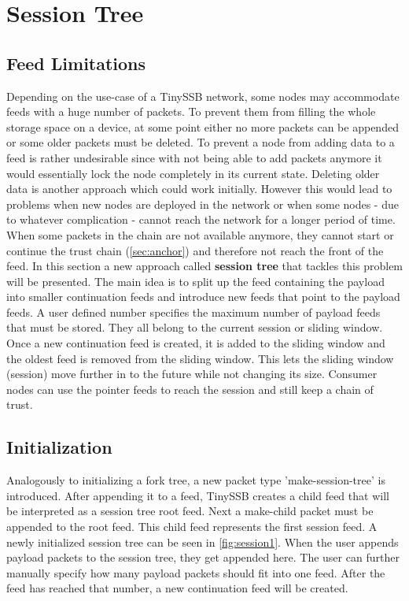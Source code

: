\section{Session Tree}

\subsection{Feed Limitations}
\label{sec:sessionlimit}
Depending on the use-case of a TinySSB network, some nodes may accommodate feeds with a huge number of packets. To prevent them from filling the whole storage space on a device, at some point either no more packets can be appended or some older packets must be deleted. To prevent a node from adding data to a feed is rather undesirable since with not being able to add packets anymore it would essentially lock the node completely in its current state. Deleting older data is another approach which could work initially. However this would lead to problems when new nodes are deployed in the network or when some nodes - due to whatever complication - cannot reach the network for a longer period of time. When some packets in the chain are not available anymore, they cannot start or continue the trust chain (\cref{sec:anchor}) and therefore not reach the front of the feed. In this section a new approach called \textbf{session tree} that tackles this problem will be presented. The main idea is to split up the feed containing the payload into smaller continuation feeds and introduce new feeds that point to the payload feeds. A user defined number specifies the maximum number of payload feeds that must be stored. They all belong to the current session or sliding window. Once a new continuation feed is created, it is added to the sliding window and the oldest feed is removed from the sliding window. This lets the sliding window (session) move further in to the future while not changing its size. Consumer nodes can use the pointer feeds to reach the session and still keep a chain of trust.

\subsection{Initialization}
Analogously to initializing a fork tree, a new packet type 'make-session-tree' is introduced. After appending it to a feed, TinySSB creates a child feed that will be interpreted as a session tree root feed. Next a make-child packet must be appended to the root feed. This child feed represents the first session feed. A newly initialized session tree can be seen in \cref{fig:session1}. When the user appends payload packets to the session tree, they get appended here. The user can further manually specify how many payload packets should fit into one feed. After the feed has reached that number, a new continuation feed will be created. 

